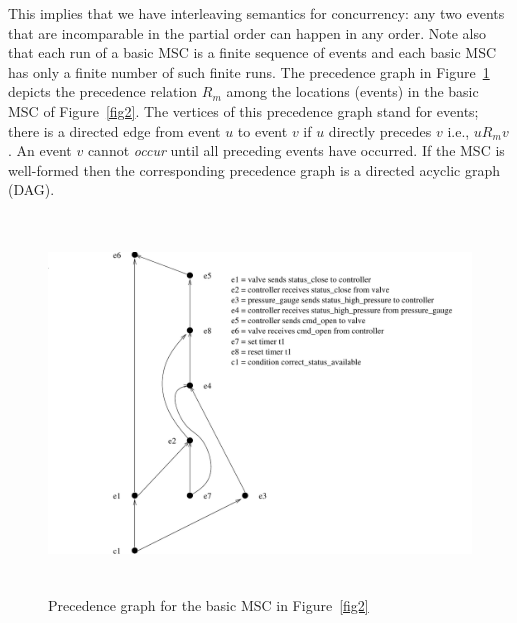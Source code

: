 \documentclass{entcs}
\begin{document}
This implies that we have interleaving semantics 
for concurrency: any two events that are 
incomparable in the partial order can happen in 
any order. Note also that each run of a basic 
MSC is a finite sequence of events and each 
basic MSC has only a finite number of such 
finite runs. The precedence graph in Figure~\ref{fig3} 
depicts the precedence relation $R_m$ among the 
locations (events) in the basic MSC of Figure~\ref{fig2}. 
The vertices of this precedence graph stand for 
events; there is a directed edge from event $u$ 
to event $v$ if $u$ directly precedes $v$ i.e., 
$u R_m v$. An event $v$ cannot {\em occur} until 
all preceding events have occurred. If the MSC 
is well-formed then the corresponding precedence 
graph is a directed acyclic graph (DAG).

\begin{figure}[t]
\centering
\includegraphics[height=10cm]{fig3}
\caption{Precedence graph for the basic MSC in Figure~\ref{fig2}}
\label{fig3}
\end{figure}


%
\end{document}
